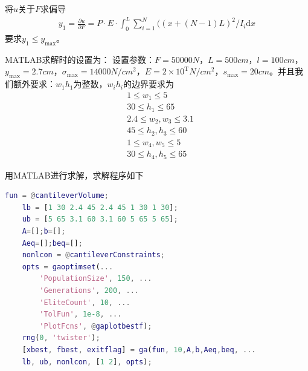     将$u$关于$F$求偏导
    \begin{align*}
    y_1 = \frac{\partial u}{\partial F} = P\cdot E\cdot {\int}_0^L\mathop{\sum}\limits_{i=1}^{N}((x+(N-1)L)^2/I_i\mathrm{d}x
    \end{align*}
    要求$y_1\leqslant y_{\max}$。
    \par
    MATLAB求解时的设置为：
    设置参数：$F=50000N$，$L=500cm$，$l=100cm$，$y_{\max}=2.7cm$，${\sigma}_{\max}=14000N/cm^2$，$E=2\times {10}^\mathrm{T} N/cm^2$，$s_{\max}=20cm$。并且我们额外要求：$w_1h_1$为整数，$w_ih_i$的边界要求为
    \begin{align*}
    & 1\leqslant w_1\leqslant 5\\
    & 30\leqslant h_1\leqslant 65\\
    & 2.4\leqslant w_2,w_3\leqslant 3.1\\
    & 45\leqslant h_2,h_3\leqslant 60\\
    & 1\leqslant w_4,w_5\leqslant 5\\
    & 30\leqslant h_4,h_5\leqslant 65
    \end{align*}
    \par
    用MATLAB进行求解，求解程序如下
    \begin{lstlisting}[language = Matlab]
    fun = @cantileverVolume;
    lb = [1 30 2.4 45 2.4 45 1 30 1 30];
    ub = [5 65 3.1 60 3.1 60 5 65 5 65];
    A=[];b=[];
    Aeq=[];beq=[];
    nonlcon = @cantileverConstraints;
    opts = gaoptimset(...
        'PopulationSize', 150, ...
        'Generations', 200, ...
        'EliteCount', 10, ...
        'TolFun', 1e-8, ...
        'PlotFcns', @gaplotbestf);
    rng(0, 'twister');
    [xbest, fbest, exitflag] = ga(fun, 10,A,b,Aeq,beq, ...
    lb, ub, nonlcon, [1 2], opts);
    \end{lstlisting}

% 
